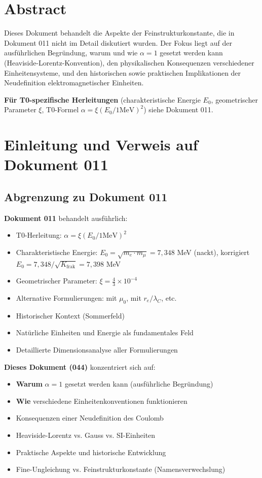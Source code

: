 \section*{Abstract}
		Dieses Dokument behandelt die Aspekte der Feinstrukturkonstante, die in Dokument 011 nicht im Detail diskutiert wurden. Der Fokus liegt auf der ausführlichen Begründung, warum und wie $\alpha = 1$ gesetzt werden kann (Heaviside-Lorentz-Konvention), den physikalischen Konsequenzen verschiedener Einheitensysteme, und den historischen sowie praktischen Implikationen der Neudefinition elektromagnetischer Einheiten.
		
		\textbf{Für T0-spezifische Herleitungen} (charakteristische Energie $E_0$, geometrischer Parameter $\xi$, T0-Formel $\alpha = \xi(E_0/1\text{MeV})^2$) siehe Dokument 011.

	
	
	
	\section{Einleitung und Verweis auf Dokument 011}
	
	\subsection{Abgrenzung zu Dokument 011}
	
	\textbf{Dokument 011} behandelt ausführlich:
	\begin{itemize}
		\item T0-Herleitung: $\alpha = \xi(E_0/1\text{MeV})^2$
		\item Charakteristische Energie: $E_0 = \sqrt{m_e \cdot m_\mu} = 7{,}348$ MeV (nackt), korrigiert $E_0 = 7{,}348/\sqrt{K_{\text{frak}}} = 7{,}398$ MeV
		\item Geometrischer Parameter: $\xi = \frac{4}{3} \times 10^{-4}$
		\item Alternative Formulierungen: mit $\mu_0$, mit $r_e/\lambda_C$, etc.
		\item Historischer Kontext (Sommerfeld)
		\item Natürliche Einheiten und Energie als fundamentales Feld
		\item Detaillierte Dimensionsanalyse aller Formulierungen
	\end{itemize}
	
	\textbf{Dieses Dokument (044)} konzentriert sich auf:
	\begin{itemize}
		\item \textbf{Warum} $\alpha = 1$ gesetzt werden kann (ausführliche Begründung)
		\item \textbf{Wie} verschiedene Einheitenkonventionen funktionieren
		\item Konsequenzen einer Neudefinition des Coulomb
		\item Heaviside-Lorentz vs. Gauss vs. SI-Einheiten
		\item Praktische Aspekte und historische Entwicklung
		\item Fine-Ungleichung vs. Feinstrukturkonstante (Namensverwechslung)
	\end{itemize}
	
